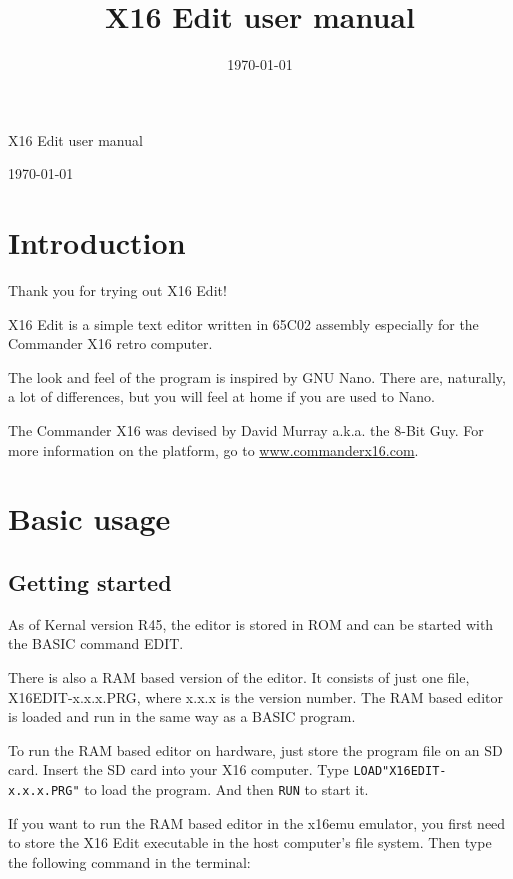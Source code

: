 \documentclass{article}
\title{X16 Edit user manual}
\date{\today}
\begin{document}
\begin{huge}
    X16 Edit user manual
\end{huge}

\vspace{1em}
\today

\vspace{4em}
\tableofcontents
\vspace{4em}

\section{Introduction}

Thank you for trying out X16 Edit!

X16 Edit is a simple text editor written in 65C02 assembly especially
for the Commander X16 retro computer. 

The look and feel of the program is inspired by GNU Nano. There are,
naturally, a lot of differences, but you will feel at home if you are
used to Nano.

The Commander X16 was devised by David Murray a.k.a. the 
8-Bit Guy. For more information on the platform, go to 
\href{http://www.commanderx16.com}{www.commanderx16.com}.

\section{Basic usage}
 
    \subsection{Getting started}
        As of Kernal version R45, the editor is stored in ROM and can be
        started with the BASIC command EDIT.

        There is also a RAM based version of the editor. It consists of just one file, 
        X16EDIT-x.x.x.PRG, where x.x.x is the version number. The RAM based editor 
        is loaded and run in the same way as a BASIC program.
        
        To run the RAM based editor on hardware, just store the program file
        on an SD card. Insert the SD card into your X16 computer. Type
        \texttt{LOAD"X16EDIT-x.x.x.PRG"} to load the program. And then \texttt{RUN} to start it.
 
        If you want to run the RAM based editor in the x16emu emulator, you first need to 
        store the X16 Edit executable in the host computer's file system.
        Then type the following command in the terminal:
 
\end{document}
